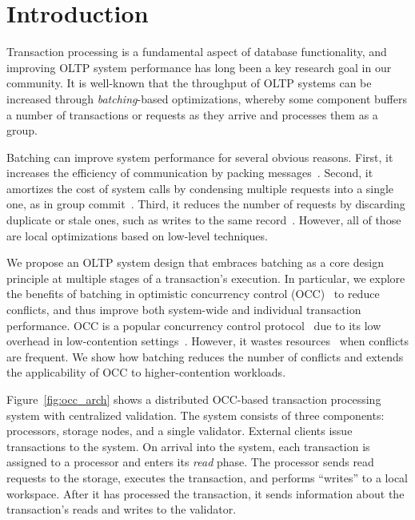 \section{Introduction}\label{sec:intro}

Transaction processing is a fundamental aspect of database functionality, and improving OLTP system performance has long been a key research goal in our community. It is well-known that the throughput of OLTP systems can be increased through \emph{batching}-based optimizations, whereby some component buffers a number of transactions or requests as they arrive and processes them as a group.

Batching can improve system performance for several obvious reasons. First, it increases the efficiency of communication by packing messages~\cite{friedman1997packing,ding2015centiman}. Second, it amortizes the cost of system calls by condensing multiple requests into a single one, as in group commit~\cite{hagmann1987reimplementing, debrabant2013anti}. Third, it reduces the number of requests by discarding duplicate or stale ones, such as writes to the same record~\cite{faleiro2014lazy}. However, all of those are local optimizations based on low-level techniques.

We propose an OLTP system design that embraces batching as a core design principle at multiple stages of a transaction's execution. In particular, we explore the benefits of batching in optimistic concurrency control (OCC)~\cite{kung81tods} to reduce conflicts, and thus improve both system-wide and individual transaction performance. OCC is a popular concurrency control protocol~\cite{bernstein11cidr,bernstein11vldb, baker11cidr, patterson12vldb,peng10osdi,corbett12osdi, warp, bernstein2015optimizing} due to its low overhead in low-contention settings~\cite{adya97podc}. However, it wastes resources~\cite{agrawal1987concurrency} when conflicts are frequent. We show how batching reduces the number of conflicts and extends the applicability of OCC to higher-contention workloads.


Figure~\ref{fig:occ_arch} shows a distributed OCC-based transaction processing system with centralized validation. The system consists of three components: processors, storage nodes, and a single validator. External clients issue transactions to the system. On arrival into the system, each transaction is assigned to a processor and enters its \emph{read} phase. The processor sends read requests to the storage, executes the transaction, and performs ``writes'' to a local workspace. After it has processed the transaction, it sends information about the transaction's reads and writes to the validator. 

